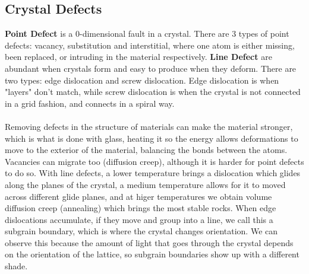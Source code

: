 \documentclass[12pt,a4paper]{report}
\begin{document}
\subsection*{Crystal Defects}
\textbf{Point Defect} is a 0-dimensional fault in a crystal.
There are 3 types of point defects: vacancy, substitution and interstitial, where one atom is either missing, been replaced, or intruding in the material respectively.
\textbf{Line Defect} are abundant when crystals form and easy to produce when they deform.
There are two types: edge dislocation and screw dislocation.
Edge dislocation is when "layers" don't match, while screw dislocation is when the crystal is not connected in a grid fashion, and connects in a spiral way.\\
\\
Removing defects in the structure of materials can make the material stronger, which is what is done with glass, heating it so the energy allows deformations to move to the exterior of the material, balancing the bonds between the atoms.
Vacancies can migrate too (diffusion creep), although it is harder for point defects to do so.
With line defects, a lower temperature brings a dislocation which glides along the planes of the crystal, a medium temperature allows for it to moved across different glide planes, and at higer temperatures we obtain volume diffusion creep (annealing) which brings the most stable rocks.
When edge dislocations accumulate, if they move and group into a line, we call this a subgrain boundary, which is where the crystal changes orientation. We can observe this because the amount of light that goes through the crystal depends on the orientation of the lattice, so subgrain boundaries show up with a different shade.
\end{document}
